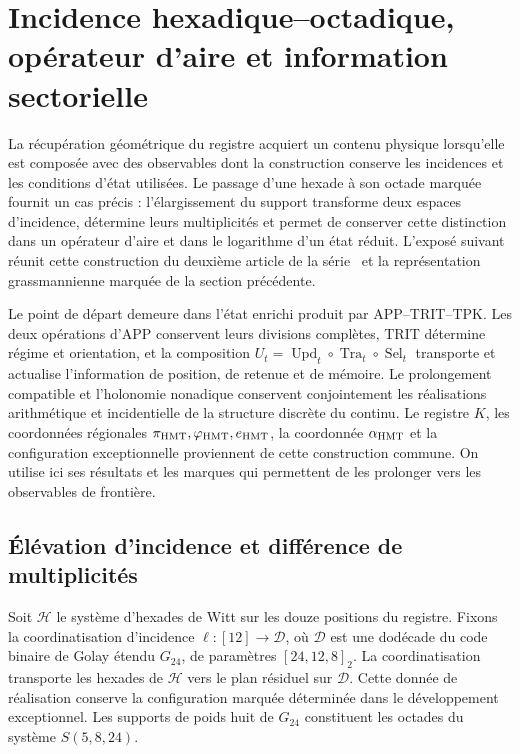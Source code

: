 \section{Incidence hexadique--octadique, opérateur d’aire et information sectorielle}
\label{rev4:ae:seccion}

La récupération géométrique du registre acquiert un contenu physique lorsqu’elle est
composée avec des observables dont la construction conserve les incidences et les
conditions d’état utilisées. Le passage d’une hexade à son octade marquée
fournit un cas précis : l’élargissement du support transforme deux
espaces d’incidence, détermine leurs multiplicités et permet de conserver
cette distinction dans un opérateur d’aire et dans le logarithme d’un état
réduit. L’exposé suivant réunit cette construction du deuxième
article de la série~\cite{hmtII} et la représentation grassmannienne
marquée de la section précédente.

Le point de départ demeure dans l’état enrichi produit par
APP--TRIT--TPK. Les deux opérations d’APP conservent leurs divisions
complètes, TRIT détermine régime et orientation, et la composition
\(U_t=\operatorname{Upd}_t\circ\operatorname{Tra}_t\circ
\operatorname{Sel}_t\) transporte et actualise l’information de position,
de retenue et de mémoire. Le prolongement compatible et l’holonomie nonadique
conservent conjointement les réalisations arithmétique et incidentielle de la
structure discrète du continu. Le registre \(K\), les coordonnées
régionales \(\pi_{\rm HMT},\varphi_{\rm HMT},e_{\rm HMT}\), la
coordonnée \(\alpha_{\rm HMT}\) et la configuration exceptionnelle proviennent
de cette construction commune. On utilise ici ses résultats et les marques
qui permettent de les prolonger vers les observables de frontière.

\subsection{Élévation d'incidence et différence de multiplicités}

Soit \(\mathcal H\) le système d'hexades de Witt sur les douze positions du registre. Fixons la coordinatisation d'incidence \(\ell:[12]\to\mathscr D\), où \(\mathscr D\) est une dodécade du code binaire de Golay étendu \(G_{24}\), de paramètres \([24,12,8]_2\). La coordinatisation transporte les hexades de \(\mathcal H\) vers le plan résiduel sur \(\mathscr D\). Cette donnée de réalisation conserve la configuration marquée déterminée dans le développement exceptionnel. Les supports de poids huit de \(G_{24}\) constituent les octades du système \(S(5,8,24)\).

